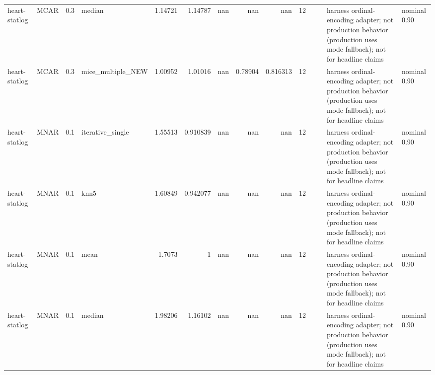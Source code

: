 \begin{table}[ht]
\begin{tabular}{llrlrrrrrrllll}
 heart-statlog        & MCAR        &         0.3 & median            &       1.14721  &             1.14787  &               nan        &                     nan        &                       nan        &        12 &                    &                                         & harness ordinal-encoding adapter; not production behavior (production uses mode fallback); not for headline claims & nominal 0.90              \\
 heart-statlog        & MCAR        &         0.3 & mice\_multiple\_NEW &       1.00952  &             1.01016  &               nan        &                       0.78904  &                         0.816313 &        12 &                    &                                         & harness ordinal-encoding adapter; not production behavior (production uses mode fallback); not for headline claims & nominal 0.90              \\
 heart-statlog        & MNAR        &         0.1 & iterative\_single  &       1.55513  &             0.910839 &               nan        &                     nan        &                       nan        &        12 &                    &                                         & harness ordinal-encoding adapter; not production behavior (production uses mode fallback); not for headline claims & nominal 0.90              \\
 heart-statlog        & MNAR        &         0.1 & knn5              &       1.60849  &             0.942077 &               nan        &                     nan        &                       nan        &        12 &                    &                                         & harness ordinal-encoding adapter; not production behavior (production uses mode fallback); not for headline claims & nominal 0.90              \\
 heart-statlog        & MNAR        &         0.1 & mean              &       1.7073   &             1        &               nan        &                     nan        &                       nan        &        12 &                    &                                         & harness ordinal-encoding adapter; not production behavior (production uses mode fallback); not for headline claims & nominal 0.90              \\
 heart-statlog        & MNAR        &         0.1 & median            &       1.98206  &             1.16102  &               nan        &                     nan        &                       nan        &        12 &                    &                                         & harness ordinal-encoding adapter; not production behavior (production uses mode fallback); not for headline claims & nominal 0.90              \\

\end{tabular}
\end{table}
